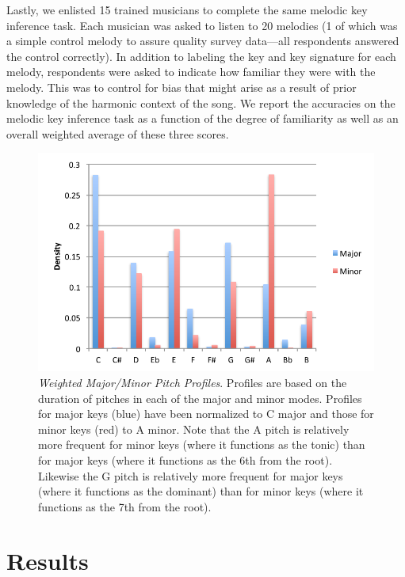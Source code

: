 \documentclass[letterpaper]{article}
\begin{document}
Lastly, we enlisted 15 trained musicians to complete the same melodic key inference task. Each musician was asked to listen to 20 melodies (1 of which was a simple control melody to assure quality survey data---all respondents answered the control correctly). In addition to labeling the key and key signature for each melody, respondents were asked to indicate how familiar they were with the melody. This was to control for bias that might arise as a result of prior knowledge of the harmonic context of the song. We report the accuracies on the melodic key inference task as a function of the degree of familiarity as well as an overall weighted average of these three scores.

\begin{figure}
  \centering
 \includegraphics[width=.5\textwidth]{./PitchProfilesWeighted.pdf}
  \caption{\emph{Weighted Major/Minor Pitch Profiles}. Profiles are based on the duration of pitches in each of the major and minor modes. Profiles for major keys (blue) have been normalized to C major and those for minor keys (red) to A minor. Note that the A pitch is relatively more frequent for minor keys (where it functions as the tonic) than for major keys (where it functions as the 6th from the root). Likewise the G pitch is relatively more frequent for major keys (where it functions as the dominant) than for minor keys (where it functions as the 7th from the root).}
  \label{fig:pitch_profiles}
\end{figure}

\section{Results}
\end{document}
